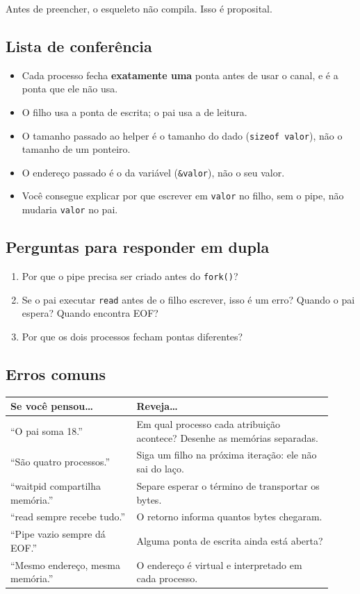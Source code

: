 \documentclass[11pt,a4paper]{article}
\newcommand{\cmd}[1]{\texttt{#1}}
\begin{document}
Antes de preencher, o esqueleto não compila. Isso é proposital.

\subsection{Lista de conferência}

\begin{itemize}
    \item Cada processo fecha \textbf{exatamente uma} ponta antes de usar o canal, e é a ponta que ele não usa.
    \item O filho usa a ponta de escrita; o pai usa a de leitura.
    \item O tamanho passado ao helper é o tamanho do dado (\cmd{sizeof valor}), não o tamanho de um ponteiro.
    \item O endereço passado é o da variável (\cmd{\&valor}), não o seu valor.
    \item Você consegue explicar por que escrever em \cmd{valor} no filho, sem o pipe, não mudaria \cmd{valor} no pai.
\end{itemize}

\subsection{Perguntas para responder em dupla}

\begin{enumerate}
    \item Por que o pipe precisa ser criado antes do \cmd{fork()}?
    \item Se o pai executar \cmd{read} antes de o filho escrever, isso é um erro? Quando o pai espera? Quando encontra EOF?
    \item Por que os dois processos fecham pontas diferentes?
\end{enumerate}

\subsection{Erros comuns}

\begin{center}
\begin{tabular}{@{}p{0.36\linewidth}p{0.56\linewidth}@{}}
\toprule
\textbf{Se você pensou\ldots} & \textbf{Reveja\ldots} \\
\midrule
``O pai soma 18.'' & Em qual processo cada atribuição acontece? Desenhe as memórias separadas. \\
``São quatro processos.'' & Siga um filho na próxima iteração: ele não sai do laço. \\
``waitpid compartilha memória.'' & Separe esperar o término de transportar os bytes. \\
``read sempre recebe tudo.'' & O retorno informa quantos bytes chegaram. \\
``Pipe vazio sempre dá EOF.'' & Alguma ponta de escrita ainda está aberta? \\
``Mesmo endereço, mesma memória.'' & O endereço é virtual e interpretado em cada processo. \\
\bottomrule
\end{tabular}
\end{center}
\end{document}

